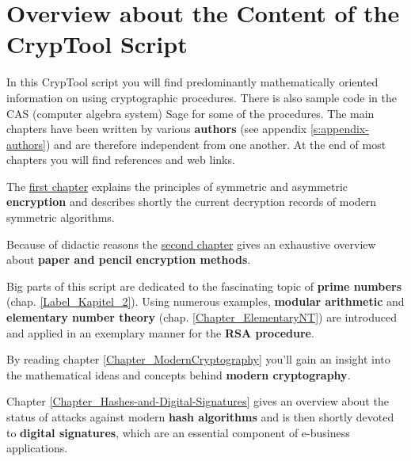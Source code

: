 
\chapter*{Overview about the Content of the CrypTool Script}  

\parskip 4pt
{
\noindent In this CrypTool script you will find predominantly
mathematically oriented information on using cryptographic procedures. There is
also sample code in the CAS (computer algebra system) Sage for some of the
procedures.
The main chapters have been written by various {\bf authors}
(see appendix \ref{s:appendix-authors}) %
and are therefore independent from one another. At the end of most chapters
you will find references and web links.

The \hyperlink{Kapitel_1}{first chapter} explains the principles of symmetric
and asymmetric {\bf encryption} and describes shortly the current decryption
records of modern symmetric algorithms.

Because of didactic reasons the \hyperlink{Kapitel_PaperandPencil}
{second chapter} gives an exhaustive overview
about {\bf paper and pencil encryption methods}.

Big parts of this script are dedicated to the fascinating topic of 
{\bf prime numbers} (chap. \ref{Label_Kapitel_2}).
Using numerous examples,
{\bf modular arithmetic} and 
{\bf elementary number theory} (chap. \ref{Chapter_ElementaryNT})
are introduced and applied in an exemplary manner for the {\bf RSA procedure}.

By reading chapter \ref{Chapter_ModernCryptography}
you'll gain an insight into the mathematical ideas and concepts behind 
{\bf modern cryptography}.

Chapter \ref{Chapter_Hashes-and-Digital-Signatures} gives
an overview about the status of attacks against modern {\bf hash algorithms}
and is then shortly devoted to {\bf digital signatures}, 
which are an essential component of e-business applications.

}
